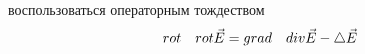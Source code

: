 
\newpage
\begin{center}
\section{ }%
\label{sec:wave_equation}
\end{center}


  воспользоваться операторным тождеством
 \begin{equation}
   rot \quad rot \vec{E} = grad \quad div \vec{E} - \mathop{}\!\mathbin\bigtriangleup \vec{E}
  \end{equation}
